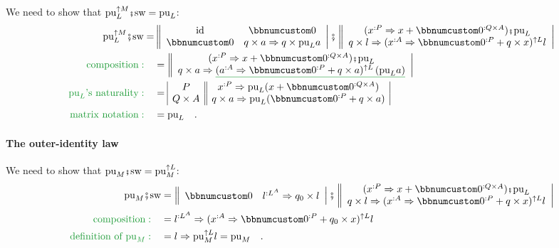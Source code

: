 We need to show that $\text{pu}_{L}^{\uparrow M}\bef\text{sw}=\text{pu}_{L}$:
\begin{align*}
\text{pu}_{L}^{\uparrow M}\bef\text{sw}= & \left\Vert \begin{array}{cc}
\text{id} & \bbnum 0\\
\bbnum 0 & q\times a\Rightarrow q\times\text{pu}_{L}a
\end{array}\right|\bef\left\Vert \begin{array}{c}
(x^{:P}\Rightarrow x+\bbnum 0^{:Q\times A})\bef\text{pu}_{L}\\
q\times l\Rightarrow(x^{:A}\Rightarrow\bbnum 0^{:P}+q\times x)^{\uparrow L}l
\end{array}\right|\\
{\color{greenunder}\text{composition}:}\quad & =\left\Vert \begin{array}{c}
(x^{:P}\Rightarrow x+\bbnum 0^{:Q\times A})\bef\text{pu}_{L}\\
q\times a\Rightarrow\gunderline{(a^{:A}\Rightarrow\bbnum 0^{:P}+q\times a)^{\uparrow L}\left(\text{pu}_{L}a\right)}
\end{array}\right|\\
{\color{greenunder}\text{pu}_{L}\text{'s naturality}:}\quad & =\begin{array}{|c||c|}
P & x^{:P}\Rightarrow\text{pu}_{L}(x+\bbnum 0^{:Q\times A})\\
Q\times A & q\times a\Rightarrow\text{pu}_{L}(\bbnum 0^{:P}+q\times a)
\end{array}\\
{\color{greenunder}\text{matrix notation}:}\quad & =\text{pu}_{L}\quad.
\end{align*}


\paragraph{The outer-identity law}

We need to show that $\text{pu}_{M}\bef\text{sw}=\text{pu}_{M}^{\uparrow L}$:
\begin{align*}
\text{pu}_{M}\bef\text{sw} & =\left\Vert \begin{array}{cc}
\bbnum 0 & l^{:L^{A}}\Rightarrow q_{0}\times l\end{array}\right|\bef\left\Vert \begin{array}{c}
(x^{:P}\Rightarrow x+\bbnum 0^{:Q\times A})\bef\text{pu}_{L}\\
q\times l\Rightarrow(x^{:A}\Rightarrow\bbnum 0^{:P}+q\times x)^{\uparrow L}l
\end{array}\right|\\
{\color{greenunder}\text{composition}:}\quad & =l^{:L^{A}}\Rightarrow(x^{:A}\Rightarrow\bbnum 0^{:P}+q_{0}\times x)^{\uparrow L}l\\
{\color{greenunder}\text{definition of }\text{pu}_{M}:}\quad & =l\Rightarrow\text{pu}_{M}^{\uparrow L}l=\text{pu}_{M}\quad.
\end{align*}


